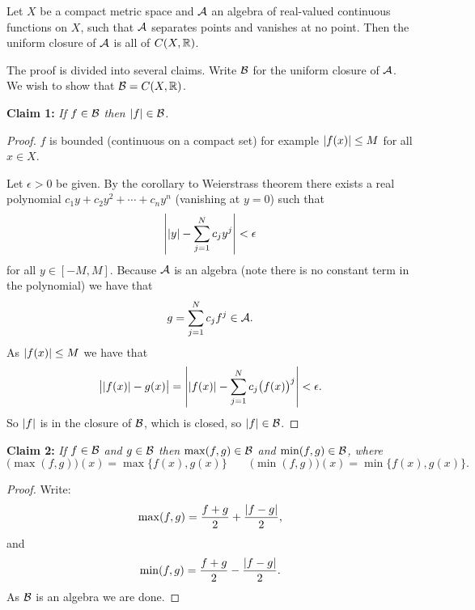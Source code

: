 \begin{thm}
Let $X$ be a compact metric space and ${\mathcal{A}}$ an algebra of real-valued
continuous functions on $X$, such that ${\mathcal{A}}$ separates points and vanishes at
no point.  Then the uniform closure of ${\mathcal{A}}$ is all of $C(X,{\mathbb{R}})$.
\end{thm}

The proof is divided into several claims.  Write ${\mathcal{B}}$ for the uniform
closure of ${\mathcal{A}}$.  We wish to show that ${\mathcal{B}} = C(X,{\mathbb{R}})$.

\medskip

\noindent
\textbf{Claim 1:} \emph{If $f \in {\mathcal{B}}$ then $\lvert {f} \rvert \in {\mathcal{B}}$.}

\begin{proof}
$f$ is bounded (continuous on a compact set) for example $\lvert {f(x)} \rvert \leq M$
for all $x \in X$.

Let $\epsilon > 0$ be given.  By the corollary to Weierstrass theorem there
exists a real polynomial $c_1 y + c_2 y^2 + \cdots+ c_n y^n$ (vanishing at
$y=0$) such that
\begin{equation*}
\left\lvert {\lvert {y} \rvert - \sum_{j=1}^N c_j y^j} \right\rvert < \epsilon
\end{equation*}
for all $y \in [-M,M]$.
Because ${\mathcal{A}}$ is an algebra (note there is no constant term in the polynomial)
we have that
\begin{equation*}
g = \sum_{j=1}^N c_j f^j \in {\mathcal{A}} .
\end{equation*}
As $\lvert {f(x)} \rvert \leq M$ we have that
\begin{equation*}
\bigl\lvert\lvert {f(x)} \rvert - g(x)\bigr\rvert
=
\left\lvert {\lvert {f(x)} \rvert - \sum_{j=1}^N c_j {\bigl(f(x)\bigr)}^j} \right\rvert
< \epsilon .
\end{equation*}
So $\lvert {f} \rvert$ is in the closure of ${\mathcal{B}}$, which is closed, so $\lvert {f} \rvert \in
{\mathcal{B}}$.
\end{proof}

\medskip

\noindent
\textbf{Claim 2:} \emph{If $f \in {\mathcal{B}}$ and $g \in {\mathcal{B}}$ then
$\max(f,g) \in {\mathcal{B}}$ and
$\min(f,g) \in {\mathcal{B}}$, where
}
\begin{equation*}
\bigl(\max(f,g)\bigr) (x) = \max \{ f(x), g(x) \} \qquad
\bigl(\min(f,g)\bigr) (x) = \min \{ f(x), g(x) \} .
\end{equation*}

\begin{proof}
Write:
\begin{equation*}
\max(f,g) = \frac{f+g}{2} + \frac{\lvert {f-g} \rvert}{2} ,
\end{equation*}
and
\begin{equation*}
\min(f,g) = \frac{f+g}{2} - \frac{\lvert {f-g} \rvert}{2} .
\end{equation*}
As ${\mathcal{B}}$ is an algebra we are done.
\end{proof}

